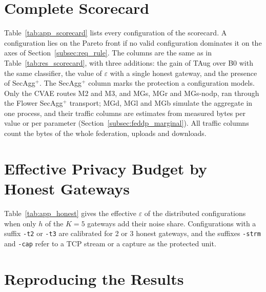 \chapter{Complete Scorecard}\label{app:scorecard}

Table~\ref{tab:app_scorecard} lists every configuration of the scorecard. A configuration lies on the Pareto front if no valid configuration dominates it on the axes of Section~\ref{subsec:req_rule}. The columns are the same as in Table~\ref{tab:res_scorecard}, with three additions: the gain of TAug over B0 with the same classifier, the value of $\varepsilon$ with a single honest gateway, and the presence of SecAgg$^+$. The SecAgg$^+$ column marks the protection a configuration models. Only the CVAE routes M2 and M3, and MGs, MGr and MGs-nodp, ran through the Flower SecAgg$^+$ transport; MGd, MGl and MGb simulate the aggregate in one process, and their traffic columns are estimates from measured bytes per value or per parameter (Section~\ref{subsec:feddp_marginal}). All traffic columns count the bytes of the whole federation, uploads and downloads.



\chapter{Effective Privacy Budget by Honest Gateways}\label{app:honest}

Table~\ref{tab:app_honest} gives the effective $\varepsilon$ of the distributed configurations when only $h$ of the $K = 5$ gateways add their noise share. Configurations with a suffix \texttt{-t2} or \texttt{-t3} are calibrated for 2 or 3 honest gateways, and the suffixes \texttt{-strm} and \texttt{-cap} refer to a TCP stream or a capture as the protected unit.



\chapter{Reproducing the Results}\label{app:repro}

